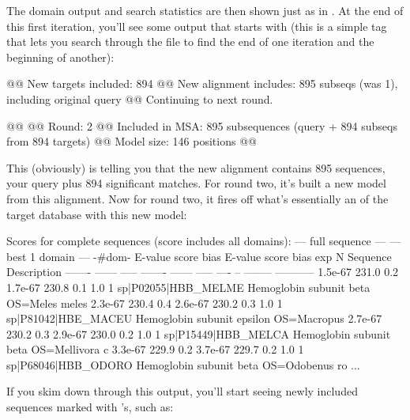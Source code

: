 The domain output and search statistics are then shown just as in
. At the end of this first iteration, you'll see some
output that starts with  (this is a simple tag that lets you
search through the file to find the end of one iteration and the
beginning of another):

\begin{sreoutput}
@@ New targets included:   894
@@ New alignment includes: 895 subseqs (was 1), including original query
@@ Continuing to next round.

@@
@@ Round:                  2
@@ Included in MSA:        895 subsequences (query + 894 subseqs from 894 targets)
@@ Model size:             146 positions
@@
\end{sreoutput}

This (obviously) is telling you that the new alignment contains 895
sequences, your query plus 894 significant matches. For round two,
it's built a new model from this alignment. Now for round two, it
fires off what's essentially an  of the target
database with this new model:

\begin{sreoutput}
Scores for complete sequences (score includes all domains):
   --- full sequence ---   --- best 1 domain ---    -#dom-
    E-value  score  bias    E-value  score  bias    exp  N  Sequence              Description
    ------- ------ -----    ------- ------ -----   ---- --  --------              -----------
    1.5e-67  231.0   0.2    1.7e-67  230.8   0.1    1.0  1  sp|P02055|HBB_MELME   Hemoglobin subunit beta OS=Meles meles
    2.3e-67  230.4   0.4    2.6e-67  230.2   0.3    1.0  1  sp|P81042|HBE_MACEU   Hemoglobin subunit epsilon OS=Macropus
    2.7e-67  230.2   0.3    2.9e-67  230.0   0.2    1.0  1  sp|P15449|HBB_MELCA   Hemoglobin subunit beta OS=Mellivora c
    3.3e-67  229.9   0.2    3.7e-67  229.7   0.2    1.0  1  sp|P68046|HBB_ODORO   Hemoglobin subunit beta OS=Odobenus ro
...
\end{sreoutput}

If you skim down through this output, you'll start seeing newly
included sequences marked with \ccode{+}'s, such as:

